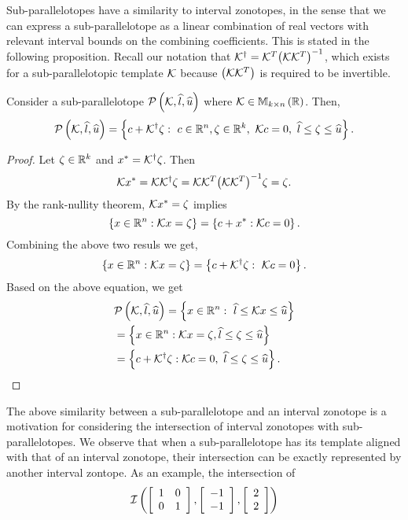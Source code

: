 Sub-parallelotopes have a similarity to interval zonotopes, in the
sense that we can express a sub-parallelotope as a linear combination
of real vectors with relevant interval bounds on the combining
coefficients.  This is stated in the following proposition.  Recall
our notation that
${\mathcal{K}}^\dagger={\mathcal{K}}^T{\left(\mathcal{K}{\mathcal{K}}^T\right)}^{-1}$,
which exists for a sub-parallelotopic template $\mathcal{K}$ because
$\left(\mathcal{K}{\mathcal{K}}^T\right)$ is required to be invertible.
%
\begin{proposition}
  Consider a sub-parallelotope
  $\mathcal{P}\left(\mathcal{K},\widehat{l},\widehat{u}\right)$ where $\mathcal{K}\in\mathbb{M}_{k\times n}\left(\mathbb{R}\right)$.
  Then,
  \[
  \mathcal{P}\left(\mathcal{K},\widehat{l},\widehat{u}\right)=\left\{c+{\mathcal{K}}^\dagger\zeta:~c\in\mathbb{R}^n,\zeta\in\mathbb{R}^k,~\mathcal{K}
  c=0,~\widehat{l}\leq
  \zeta\leq \widehat{u}
  \right\}.
  \]
%
\end{proposition}
%
\begin{proof}
Let $\zeta\in\mathbb{R}^k$ and $x^*={\mathcal{K}}^\dagger\zeta$.  Then
%
\[
\mathcal{K} x^*=\mathcal{K}{\mathcal{K}}^\dagger\zeta = \mathcal{K}\mathcal{K}^T{\left(\mathcal{K}\mathcal{K}^T\right)}^{-1}\zeta=\zeta.
\]
%
By the rank-nullity theorem, $\mathcal{K} x^* = \zeta$ implies
%
\begin{equation}
\left\{x\in\mathbb{R}^n:\mathcal{K} x=\zeta\right\}=\left\{c+x^*:\mathcal{K} c=0\right\}.
\end{equation}
%
Combining the above two resuls we get,
%
\begin{equation}
\left\{x\in\mathbb{R}^n:\mathcal{K} x=\zeta\right\}=\left\{c+{\mathcal{K}}^\dagger\zeta:~\mathcal{K} c=0\right\}.
\end{equation}
%
Based on the above equation, we get
%
\begin{align*}
& \mathcal{P}\left(\mathcal{K},\widehat{l},\widehat{u}\right) = \left\{x\in\mathbb{R}^n:~\widehat{l}\leq \mathcal{K} x\leq\widehat{u}\right\}\nonumber\\
& = \left\{x\in\mathbb{R}^n:\mathcal{K}
  x=\zeta, \widehat{l}\leq \zeta\leq\widehat{u}\right\}\nonumber\\
& = \left\{c+{\mathcal{K}}^\dagger\zeta:\mathcal{K} c=0,~\widehat{l}\leq\zeta\leq\widehat{u}\right\}.~~~\qedhere
\end{align*}
%
\end{proof}
%
The above similarity between a sub-parallelotope and an interval
zonotope is a motivation for considering the intersection of interval
zonotopes with sub-parallelotopes.  We observe that when a
sub-parallelotope has its template aligned with that of an interval
zonotope, their intersection can be exactly represented by another
interval zontope.  As an example, the intersection of
%
\[
\mathit{\operatorname{\mathcal{I}}}\left(\left[\begin{array}{l l}1 & 0 \\ 0 &
      1\end{array}\right],\left[\begin{array}{c}-1\\ -1\end{array}\right],\left[\begin{array}{c}2\\ 2\end{array}\right]\right)
\]
